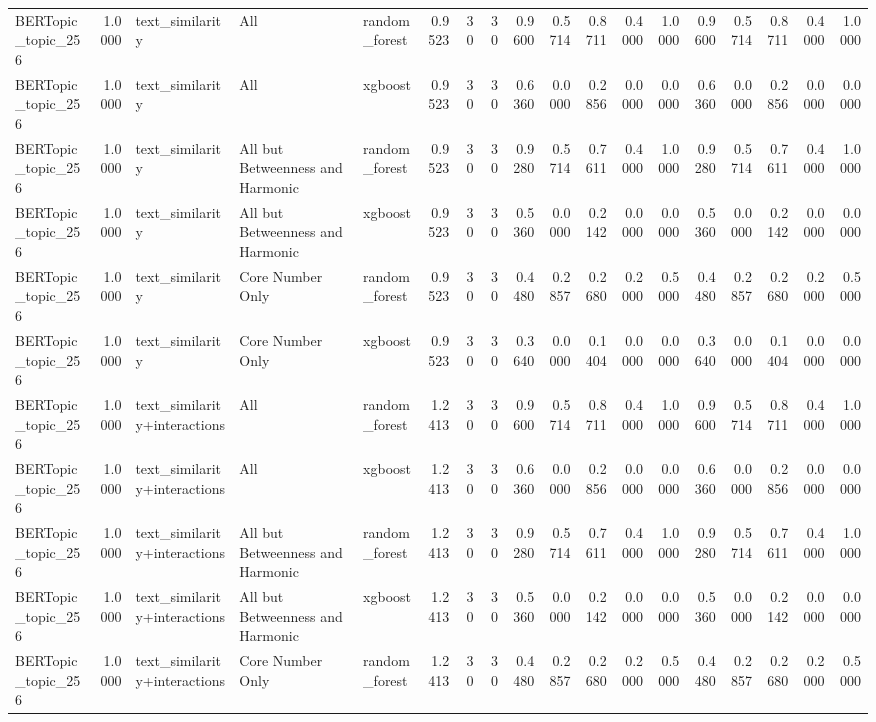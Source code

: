 \begin{tabular}{lrlllrrrrrrrrrrrrr}
BERTopic_topic_256 & 1.0000 & text_similarity & All & random_forest & 0.9523 & 30 & 30 & 0.9600 & 0.5714 & 0.8711 & 0.4000 & 1.0000 & 0.9600 & 0.5714 & 0.8711 & 0.4000 & 1.0000 \\
BERTopic_topic_256 & 1.0000 & text_similarity & All & xgboost & 0.9523 & 30 & 30 & 0.6360 & 0.0000 & 0.2856 & 0.0000 & 0.0000 & 0.6360 & 0.0000 & 0.2856 & 0.0000 & 0.0000 \\
BERTopic_topic_256 & 1.0000 & text_similarity & All but Betweenness and Harmonic & random_forest & 0.9523 & 30 & 30 & 0.9280 & 0.5714 & 0.7611 & 0.4000 & 1.0000 & 0.9280 & 0.5714 & 0.7611 & 0.4000 & 1.0000 \\
BERTopic_topic_256 & 1.0000 & text_similarity & All but Betweenness and Harmonic & xgboost & 0.9523 & 30 & 30 & 0.5360 & 0.0000 & 0.2142 & 0.0000 & 0.0000 & 0.5360 & 0.0000 & 0.2142 & 0.0000 & 0.0000 \\
BERTopic_topic_256 & 1.0000 & text_similarity & Core Number Only & random_forest & 0.9523 & 30 & 30 & 0.4480 & 0.2857 & 0.2680 & 0.2000 & 0.5000 & 0.4480 & 0.2857 & 0.2680 & 0.2000 & 0.5000 \\
BERTopic_topic_256 & 1.0000 & text_similarity & Core Number Only & xgboost & 0.9523 & 30 & 30 & 0.3640 & 0.0000 & 0.1404 & 0.0000 & 0.0000 & 0.3640 & 0.0000 & 0.1404 & 0.0000 & 0.0000 \\
BERTopic_topic_256 & 1.0000 & text_similarity+interactions & All & random_forest & 1.2413 & 30 & 30 & 0.9600 & 0.5714 & 0.8711 & 0.4000 & 1.0000 & 0.9600 & 0.5714 & 0.8711 & 0.4000 & 1.0000 \\
BERTopic_topic_256 & 1.0000 & text_similarity+interactions & All & xgboost & 1.2413 & 30 & 30 & 0.6360 & 0.0000 & 0.2856 & 0.0000 & 0.0000 & 0.6360 & 0.0000 & 0.2856 & 0.0000 & 0.0000 \\
BERTopic_topic_256 & 1.0000 & text_similarity+interactions & All but Betweenness and Harmonic & random_forest & 1.2413 & 30 & 30 & 0.9280 & 0.5714 & 0.7611 & 0.4000 & 1.0000 & 0.9280 & 0.5714 & 0.7611 & 0.4000 & 1.0000 \\
BERTopic_topic_256 & 1.0000 & text_similarity+interactions & All but Betweenness and Harmonic & xgboost & 1.2413 & 30 & 30 & 0.5360 & 0.0000 & 0.2142 & 0.0000 & 0.0000 & 0.5360 & 0.0000 & 0.2142 & 0.0000 & 0.0000 \\
BERTopic_topic_256 & 1.0000 & text_similarity+interactions & Core Number Only & random_forest & 1.2413 & 30 & 30 & 0.4480 & 0.2857 & 0.2680 & 0.2000 & 0.5000 & 0.4480 & 0.2857 & 0.2680 & 0.2000 & 0.5000 \\

\end{tabular}
